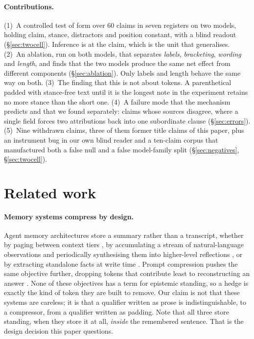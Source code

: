 \documentclass[11pt]{article}
\begin{document}
\paragraph{Contributions.}
(1)~A controlled test of form over $60$ claims in seven registers on two models, holding
claim, stance, distractors and position constant, with a blind readout
(\S\ref{sec:twocell}). Inference is at the claim, which is the unit that generalises.
(2)~An ablation, run on both models, that separates \emph{labels}, \emph{bracketing},
\emph{wording} and \emph{length}, and finds that the two models produce the same net
effect from different components (\S\ref{sec:ablation}). Only labels and length behave
the same way on both.
(3)~The finding that this is not about tokens. A parenthetical padded with stance-free
text until it is the longest note in the experiment retains no more stance than the
short one.
(4)~A failure mode that the mechanism predicts and that we found separately: claims whose
sources disagree, where a single field forces two attributions back into one subordinate
clause (\S\ref{sec:errors}).
(5)~Nine withdrawn claims, three of them former title claims of this paper, plus an instrument bug in our
own blind reader and a ten-claim corpus that manufactured both a false null and a false
model-family split (\S\ref{sec:negatives}, \S\ref{sec:twocell}).

\section{Related work}
\paragraph{Memory systems compress by design.} Agent memory architectures store a
summary rather than a transcript, whether by paging between context tiers
\citep{packer2023memgpt}, by accumulating a stream of natural-language observations and
periodically synthesising them into higher-level reflections
\citep{park2023generative}, or by extracting standalone facts at write time
\citep{chhikara2025mem0}. Prompt compression pushes the same objective further, dropping
tokens that contribute least to reconstructing an answer
\citep{jiang2023llmlingua,wang2025recursive}. None of these objectives has a term for
epistemic standing, so a hedge is exactly the kind of token they are built to remove. Our
claim is not that these systems are careless; it is that a qualifier written as prose is
indistinguishable, to a compressor, from a qualifier written as padding. Note that all
three store standing, when they store it at all, \emph{inside} the remembered sentence.
That is the design decision this paper questions.
\end{document}
